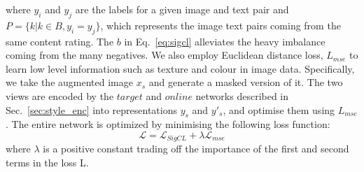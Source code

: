 where $y_i$ and $y_j$ are the labels for a given image and text pair and $P = \{k|k\in B, y_i=y_j\}$, which represents the image text pairs coming from the same content rating. The $b$ in Eq.~\ref{eq:sigcl} alleviates the heavy imbalance coming from the many negatives. We also employ Euclidean distance loss, $L_{mse}$ to learn low level information such as texture and colour in image data. Specifically, we take the augmented image $x_s$ and generate a masked version of it. The two views are encoded by the $target$ and $online$ networks described in Sec.~\ref{sec:style_enc} into representations $y_s$ and $y'_s$, and optimise them using  $L_{mse}$. The entire network is optimized by minimising the following loss function:%
\begin{equation}
\label{eq:finallos}
    \mathcal{L} = \mathcal{L}_{SigCL}+\lambda \mathcal{L}_{mse}
\end{equation}
where $\lambda$ is a positive constant trading off the importance of the first and second terms in the loss L.

